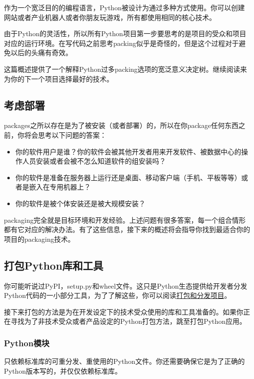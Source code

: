 \documentclass[../package_tutorial.tex]{subfiles}
\begin{document}
作为一个宽泛目的的编程语言，Python被设计为通过多种方式使用。你可以创建网站或者产业机器人或者你朋友玩游戏，所有都使用相同的核心技术。

由于Python的灵活性，所以所有Python项目第一步要思考的是项目的受众和项目对应的运行环境。在写代码之前思考packing似乎是奇怪的，但是这个过程对于避免以后的头痛有奇效。

这篇概述提供了一个解释Python过多packing选项的宽泛意义决定树。继续阅读来为你的下一个项目选择最好的技术。

\subsection{考虑部署}

packages之所以存在是为了被安装（或者部署）的，所以在你package任何东西之前，你将会思考以下问题的答案：
\begin{itemize}
    \item 你的软件用户是谁？你的软件会被其他开发者用来开发软件、被数据中心的操作人员安装或者会被不怎么知道软件的组安装吗？
    \item 你的软件是准备在服务器上运行还是桌面、移动客户端（手机、平板等等）或者是嵌入在专用机器上？
    \item 你的软件是被个体安装还是被大规模安装？
\end{itemize}
packaging完全就是目标环境和开发经验。上述问题有很多答案，每一个组合情形都有它对应的解决办法。有了这些信息，接下来的概述将会指导你找到最适合你的项目的packaging技术。

\subsection{打包Python库和工具}

你可能听说过PyPI，setup.py和wheel文件。这只是Python生态提供给开发者分发Python代码的一小部分工具，为了了解这些，你可以阅读\href{https://packaging.python.org/guides/distributing-packages-using-setuptools/}{打包和分发项目}。

接下来打包的方法是为在开发设定下的技术受众使用的库和工具准备的。如果你正在寻找为了非技术受众或者产品设定的Python打包方法，跳至打包Python应用。

\subsubsection{Python模块}

只依赖标准库的可重分发、重使用的Python文件。你还需要确保它是为了正确的Python版本写的，并仅仅依赖标准库。
\end{document}
